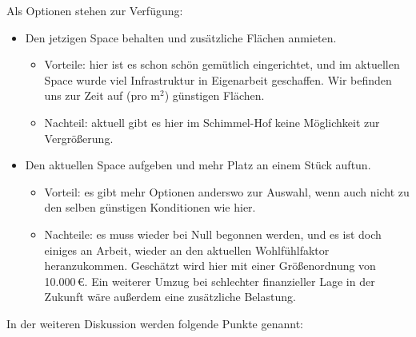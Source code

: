 \documentclass{s0minutes}
\begin{document}
Als Optionen stehen zur Verfügung:
\begin{itemize}
  \item Den jetzigen Space behalten und zusätzliche Flächen anmieten.
    \begin{itemize}
      \item Vorteile: hier ist es schon schön gemütlich eingerichtet,
        und im aktuellen Space wurde viel Infrastruktur in Eigenarbeit
        geschaffen.
        Wir befinden uns zur Zeit auf (pro m$^2$) günstigen Flächen.
      \item Nachteil: aktuell gibt es hier im Schimmel-Hof keine Möglichkeit zur
        Vergrößerung.
    \end{itemize}
  \item Den aktuellen Space aufgeben und mehr Platz an einem Stück auftun.
    \begin{itemize}
      \item Vorteil: es gibt mehr Optionen anderswo zur Auswahl, wenn auch nicht
        zu den selben günstigen Konditionen wie hier.
      \item Nachteile: es muss wieder bei Null begonnen werden, und es ist doch
        einiges an Arbeit, wieder an den aktuellen Wohlfühlfaktor heranzukommen.
        Geschätzt wird hier mit einer Größenordnung von 10{.}000\,€.
        Ein weiterer Umzug bei schlechter finanzieller Lage in der Zukunft wäre
        außerdem eine zusätzliche Belastung.
    \end{itemize}
\end{itemize}

In der weiteren Diskussion werden folgende Punkte genannt:
\end{document}
